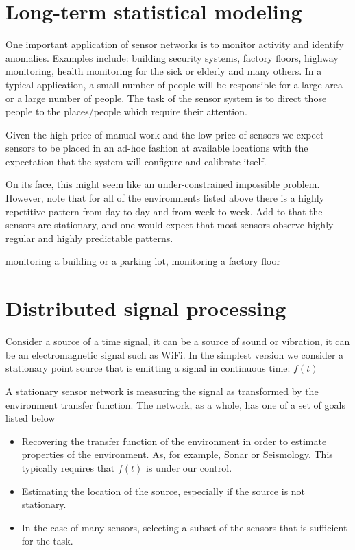 \documentclass{article}
\begin{document}
\section{Long-term statistical modeling}
 One important application of sensor networks is to monitor activity and identify anomalies. Examples include: building security systems, factory floors, highway monitoring, health monitoring for the sick or elderly and many others. In a typical application, a small number of people will be responsible for a large area or a large number of people. The task of the sensor system is to direct those people to the places/people which require their attention. 
 
 Given the high price of manual work and the low price of sensors we expect sensors to be placed in an ad-hoc fashion at available locations with the expectation that the system will configure and calibrate itself.
 
 On its face, this might seem like an under-constrained impossible problem. However, note that for all of the environments listed above there is a highly repetitive pattern from day to day and from week to week. Add to that the sensors are stationary, and one would expect that most sensors observe highly regular and highly predictable patterns.
 
 
 
 monitoring a building or a parking lot, monitoring a factory floor

\section{Distributed signal processing}

Consider a source of a time signal, it can be a source of sound or vibration, it can be an electromagnetic signal such as WiFi. In the simplest version we consider a stationary point source that is emitting a signal in continuous time: $f(t)$

A stationary sensor network is measuring the signal as transformed by the environment transfer function. The network, as a whole, has one of a set of goals listed below

\begin{itemize}
    \item Recovering the transfer function of the environment in order to estimate properties of the environment. As, for example, Sonar or Seismology. This typically requires that $f(t)$ is under our control.
    \item Estimating the location of the source, especially if the source is not stationary.
    \item In the case of many sensors, selecting a subset of the sensors that is sufficient for the task.
\end{itemize}
\end{document}
